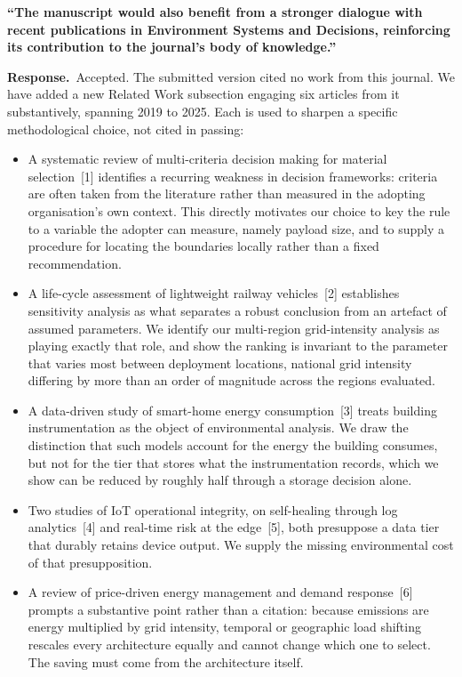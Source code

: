 \documentclass[11pt,a4paper]{article}
\newcommand{\point}[1]{\medskip\noindent\textbf{\color{black!75}#1}\par\smallskip}
\newcommand{\reply}{\noindent\textbf{Response.}\ }
\begin{document}
\point{``The manuscript would also benefit from a stronger dialogue with recent publications in
Environment Systems and Decisions, reinforcing its contribution to the journal's body of
knowledge.''}

\reply Accepted. The submitted version cited no work from this journal. We have added a new Related
Work subsection engaging six articles from it substantively, spanning 2019 to 2025. Each is used to
sharpen a specific methodological choice, not cited in passing:

\begin{itemize}\setlength{\itemsep}{4pt}
  \item A systematic review of multi-criteria decision making for material selection~[1] identifies a
  recurring weakness in decision frameworks: criteria are often taken from the literature rather than
  measured in the adopting organisation's own context. This directly motivates our choice to key the rule
  to a variable the adopter can measure, namely payload size, and to supply a procedure for locating the
  boundaries locally rather than a fixed recommendation.

  \item A life-cycle assessment of lightweight railway vehicles~[2] establishes sensitivity analysis as
  what separates a robust conclusion from an artefact of assumed parameters. We identify our multi-region
  grid-intensity analysis as playing exactly that role, and show the ranking is invariant to the parameter
  that varies most between deployment locations, national grid intensity differing by more than an order of
  magnitude across the regions evaluated.

  \item A data-driven study of smart-home energy consumption~[3] treats building instrumentation as the
  object of environmental analysis. We draw the distinction that such models account for the energy the
  building consumes, but not for the tier that stores what the instrumentation records, which we show can
  be reduced by roughly half through a storage decision alone.

  \item Two studies of IoT operational integrity, on self-healing through log analytics~[4] and real-time
  risk at the edge~[5], both presuppose a data tier that durably retains device output. We supply the
  missing environmental cost of that presupposition.

  \item A review of price-driven energy management and demand response~[6] prompts a substantive point
  rather than a citation: because emissions are energy multiplied by grid intensity, temporal or
  geographic load shifting rescales every architecture equally and cannot change which one to select. The
  saving must come from the architecture itself.
\end{itemize}
\end{document}
